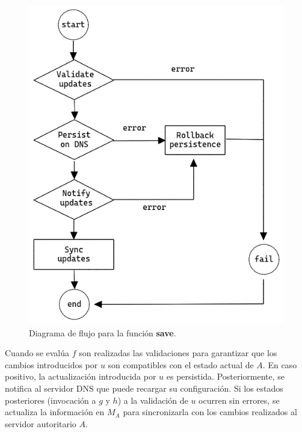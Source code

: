 \begin{figure}[!ht]
    \centering
    \includegraphics[width=0.6\linewidth]{draws/save.png}
    \caption{Diagrama de flujo para la función \textbf{save}.}
\end{figure}

Cuando se evalúa $f$ son realizadas las validaciones para garantizar que los cambios introducidos por $u$ son compatibles con el estado actual de $A$. En caso positivo, la actualización introducida por $u$ es persistida. Posteriormente, se notifica al servidor DNS que puede recargar su configuración. Si los estados posteriores (invocación a $g$ y $h$) a la validación de $u$ ocurren sin errores, se actualiza la información en $M_A$ para sincronizarla con los cambios realizados al servidor autoritario $A$.

